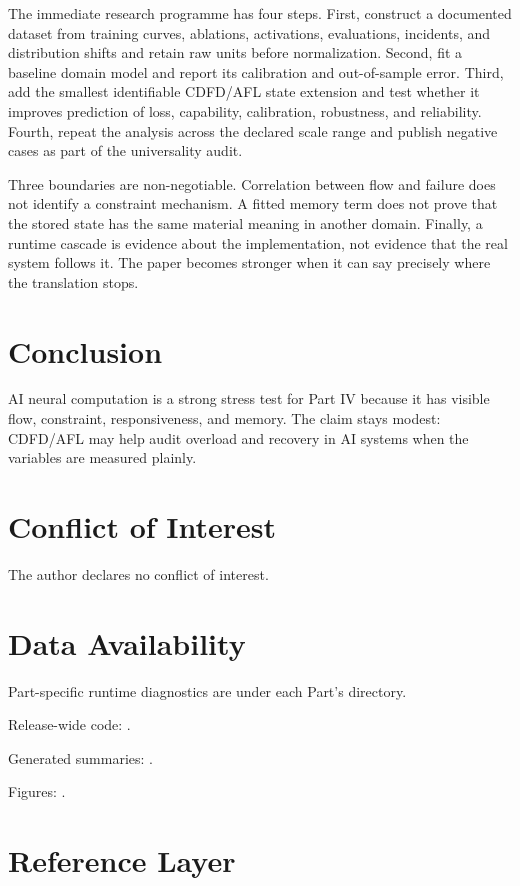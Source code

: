 \documentclass[12pt,a4paper]{article}
\begin{document}
The immediate research programme has four steps. First, construct a documented
dataset from training curves, ablations, activations, evaluations, incidents, and distribution shifts and retain raw units before normalization.
Second, fit a baseline domain model and report its calibration and out-of-sample
error. Third, add the smallest identifiable CDFD/AFL state extension and test
whether it improves prediction of loss, capability, calibration, robustness, and reliability. Fourth, repeat the
analysis across the declared scale range and publish negative cases as part of
the universality audit.

Three boundaries are non-negotiable. Correlation between flow and failure does
not identify a constraint mechanism. A fitted memory term does not prove that
the stored state has the same material meaning in another domain. Finally, a
runtime cascade is evidence about the implementation, not evidence that the
real system follows it. The paper becomes stronger when it can say precisely
where the translation stops.



\section{Conclusion}

AI neural computation is a strong stress test for Part IV because it has visible
flow, constraint, responsiveness, and memory. The claim stays modest: CDFD/AFL
may help audit overload and recovery in AI systems when the variables are
measured plainly.

\section*{Conflict of Interest}
The author declares no conflict of interest.

\section*{Data Availability}
Part-specific runtime diagnostics are under each Part's  directory.

Release-wide code: .

Generated summaries: .

Figures: .


\section{Reference Layer}



\end{document}
